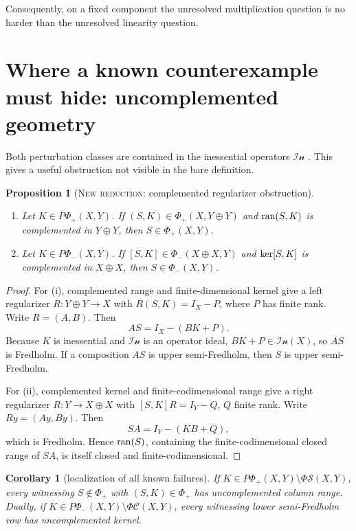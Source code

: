 \documentclass[11pt]{article}
\newtheorem{proposition}[theorem]{Proposition}
\newtheorem{corollary}[theorem]{Corollary}
\theoremstyle{definition}
\newcommand{\Iness}{\mathcal{In}}
\newcommand{\PhiS}{\Phi\mathcal S}
\newcommand{\PhiC}{\Phi\mathcal C}
\newcommand{\PhiP}{\Phi_+}
\newcommand{\PhiM}{\Phi_-}
\newcommand{\PPhiP}{P\Phi_+}
\newcommand{\PPhiM}{P\Phi_-}
\newcommand{\ran}{\mathop{\rm ran}}
\newcommand{\kerop}{\mathop{\rm ker}}
\newcommand{\newresult}{\textcolor{newblue}{\textsc{New reduction}}}
\begin{document}
Consequently, on a fixed component the unresolved multiplication question is no harder
than the unresolved linearity question.

\section{Where a known counterexample must hide: uncomplemented geometry}

Both perturbation classes are contained in the inessential operators
\(\Iness\) \cite{Aiena2012}.  This gives a useful obstruction not visible in the bare
definition.

\begin{proposition}[\newresult: complemented regularizer obstruction]\label{prop:comp}
\begin{enumerate}[label=\rm(\roman*)]
\item Let \(K\in\PPhiP(X,Y)\).  If \((S,K)\in\PhiP(X,Y\oplus Y)\) and
\(\ran(S,K)\) is complemented in \(Y\oplus Y\), then \(S\in\PhiP(X,Y)\).
\item Let \(K\in\PPhiM(X,Y)\).  If \([S,K]\in\PhiM(X\oplus X,Y)\) and
\(\kerop[S,K]\) is complemented in \(X\oplus X\), then \(S\in\PhiM(X,Y)\).
\end{enumerate}
\end{proposition}

\begin{proof}
For (i), complemented range and finite-dimensional kernel give a left regularizer
\(R\colon Y\oplus Y\to X\) with
\(R(S,K)=I_X-P\), where \(P\) has finite rank.  Write \(R=(A,B)\).  Then
\[
 AS=I_X-(BK+P).
\]
Because \(K\) is inessential and \(\Iness\) is an operator ideal,
\(BK+P\in\Iness(X)\), so \(AS\) is Fredholm.  If a composition \(AS\) is upper
semi-Fredholm, then \(S\) is upper semi-Fredholm.

For (ii), complemented kernel and finite-codimensional range give a right regularizer
\(R\colon Y\to X\oplus X\) with \([S,K]R=I_Y-Q\), \(Q\) finite rank.  Write
\(Ry=(Ay,By)\).  Then
\[
 SA=I_Y-(KB+Q),
\]
which is Fredholm.  Hence \(\ran(S)\), containing the finite-codimensional closed range
of \(SA\), is itself closed and finite-codimensional.
\end{proof}

\begin{corollary}[localization of all known failures]
If \(K\in\PPhiP(X,Y)\setminus\PhiS(X,Y)\), every witnessing
\(S\notin\PhiP\) with \((S,K)\in\PhiP\) has uncomplemented column range.  Dually, if
\(K\in\PPhiM(X,Y)\setminus\PhiC(X,Y)\), every witnessing lower semi-Fredholm row has
uncomplemented kernel.
\end{corollary}
\end{document}
